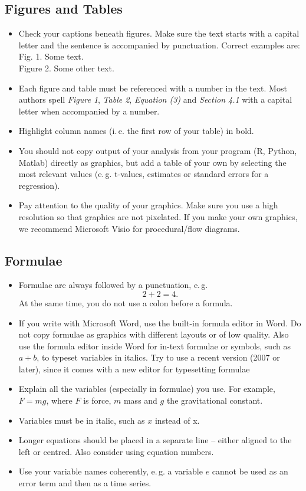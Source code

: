 \documentclass{thesisclass}
\newcommand\ie{i.\,e.\xspace}
\newcommand\eg{e.\,g.\xspace}
\begin{document}
\subsection{Figures and Tables}

\begin{itemize}
	\item Check your captions beneath figures. Make sure the text starts with a capital letter and the sentence is accompanied by punctuation. Correct examples are: \\ 
	Fig. 1. Some text. \\
	Figure 2. Some other text.
	\item Each figure and table must be referenced with a number in the text. Most authors spell \emph{Figure 1}, \emph{Table 2}, \emph{Equation (3)} and \emph{Section 4.1} with a capital letter when accompanied by a number.
	\item Highlight column names (\ie the first row of your table) in bold.
	\item You should not copy output of your analysis from your program (R, Python, Matlab) directly as graphics, but add a table of your own by selecting the most relevant values (\eg t-values, estimates or standard errors for a regression).
	\item Pay attention to the quality of your graphics. Make sure you use a high resolution so that graphics are not pixelated. If you make your own graphics, we recommend Microsoft Visio for procedural/flow diagrams.
\end{itemize}

\subsection{Formulae}

\begin{itemize}
	\item Formulae are always followed by a punctuation, \eg
	\begin{equation}
		2 + 2 = 4.
	\end{equation}
	At the same time, you do not use a colon before a formula.
	\item If you write with Microsoft Word, use the built-in formula editor in Word. Do not copy formulae as graphics with different layouts or of low quality. Also use the formula editor inside Word for in-text formulae or symbols, such as $a+b$, to typeset variables in italics. Try to use a recent version (2007 or later), since it comes with a new editor for typesetting formulae
	\item Explain all the variables (especially in formulae) you use. For example, $F = mg$, where $F$ is force, $m$ mass and $g$ the gravitational constant.
	\item Variables must be in italic, such as $x$ instead of x.
	\item Longer equations should be placed in a separate line -- either aligned to the left or centred. Also consider using equation numbers.
	\item Use your variable names coherently, \eg a variable $e$ cannot be used as an error term and then as a time series.
\end{itemize}
\end{document}

